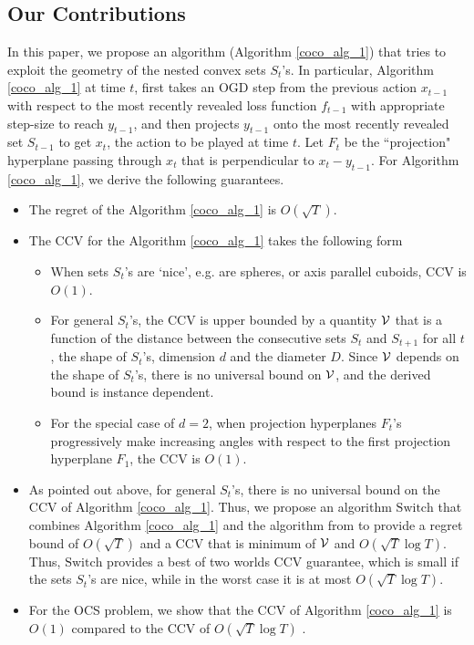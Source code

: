 \subsection{Our Contributions}
In this paper, we propose an algorithm (Algorithm \ref{coco_alg_1}) that tries to exploit the geometry of the nested convex sets $S_t$'s. In particular, Algorithm \ref{coco_alg_1} at time $t$, first takes an OGD step from the previous action $x_{t-1}$ with respect to the most recently revealed loss function $f_{t-1}$ with appropriate step-size to reach $y_{t-1}$, and then projects $y_{t-1}$ onto  the most recently revealed set $S_{t-1}$ to get $x_t$,  the action to be played at time $t$. 
Let $F_t$ be the ``projection" hyperplane passing through $x_t$ that is perpendicular to $x_t-y_{t-1}$. For Algorithm \ref{coco_alg_1}, we derive the following guarantees.
\begin{itemize}
\item The regret of the Algorithm \ref{coco_alg_1} is $O(\sqrt{T})$.
\item The CCV for the Algorithm \ref{coco_alg_1} takes the following form 
\begin{itemize}
\item When sets $S_t$'s are `nice', e.g. are spheres, or axis parallel cuboids, CCV is $O(1)$.
\item For general $S_t$'s, the CCV is upper bounded by a quantity $\mathcal{V}$ that is a function of the distance between the consecutive sets $S_t$ and $S_{t+1}$ for all $t$, the shape of $S_t$'s, dimension $d$ and the diameter $D$.  Since $\mathcal{V}$ depends on the shape of $S_t$'s, there is no universal bound on $\mathcal{V}$, and the derived bound is instance dependent.
\item 
For the special case of $d=2$, when projection hyperplanes $F_t$'s progressively make increasing angles with respect to the first projection hyperplane $F_1$, the CCV is $O(1)$.
\end{itemize}
\item As pointed out above, for general $S_t$'s, there is no universal bound on the CCV of Algorithm \ref{coco_alg_1}. 
Thus, we propose an algorithm $\mathrm{Switch}$  that combines Algorithm \ref{coco_alg_1} and the algorithm from \cite{Sinha2024} to provide a regret bound of $O(\sqrt{T})$ and a CCV that is minimum of $\mathcal{V}$ and $O(\sqrt{T} \log T)$. Thus, $\mathrm{Switch}$ provides a best of two worlds  CCV guarantee, which is small if the sets $S_t$'s are nice, while in the worst case it is at most $O(\sqrt{T} \log T)$.
\item For the OCS problem, we show that the CCV of Algorithm \ref{coco_alg_1} is $O(1)$ compared to the CCV of $O(\sqrt{T} \log T)$ \cite{Sinha2024}.
\end{itemize}

